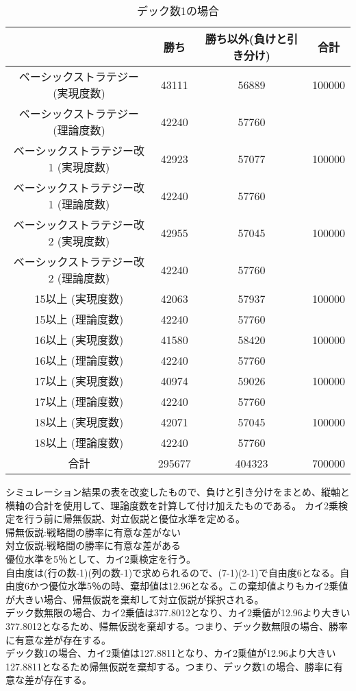 \begin{table}[H]
 \begin{center}
  \begin{tabular}{|c|c|c|c|}
    \hline
      & 勝ち & 勝ち以外(負けと引き分け) & 合計 \\
    \hline ベーシックストラテジー (実現度数)& 43111 & 56889 & 100000 \\
             ベーシックストラテジー (理論度数)& 42240 & 57760 &  \\
    \hline ベーシックストラテジー改1 (実現度数)& 42923 & 57077 & 100000 \\
             ベーシックストラテジー改1 (理論度数)& 42240 & 57760 &  \\
    \hline ベーシックストラテジー改2 (実現度数)& 42955 & 57045 & 100000 \\
              ベーシックストラテジー改2 (理論度数)& 42240 & 57760 &  \\
    \hline 15以上 (実現度数)& 42063 & 57937 & 100000 \\
             15以上 (理論度数)& 42240 & 57760 & 　\\
    \hline 16以上 (実現度数)& 41580 & 58420 & 100000 \\
             16以上 (理論度数)& 42240 & 57760 & 　\\
    \hline 17以上 (実現度数)& 40974 & 59026 & 100000 \\
             17以上 (理論度数)& 42240 & 57760 & 　\\
    \hline 18以上 (実現度数)& 42071 & 57045 & 100000 \\
             18以上 (理論度数)& 42240 & 57760 & 　\\
    \hline  合計 & 295677 & 404323 & 700000 \\
    \hline
  \end{tabular}
 \end{center}
 \caption{デック数1の場合}
\end{table}
\clearpage
シミュレーション結果の表を改変したもので、負けと引き分けをまとめ、縦軸と横軸の合計を使用して、理論度数を計算して付け加えたものである。
カイ2乗検定を行う前に帰無仮説、対立仮説と優位水準を定める。\\
帰無仮説:戦略間の勝率に有意な差がない\\
対立仮説:戦略間の勝率に有意な差がある\\
優位水準を5％として、カイ2乗検定を行う。\\
自由度は(行の数-1)(列の数-1)で求められるので、(7-1)(2-1)で自由度6となる。自由度6かつ優位水準5％の時、棄却値は12.96となる。この棄却値よりもカイ2乗値が大きい場合、帰無仮説を棄却して対立仮説が採択される。\\
デック数無限の場合、カイ2乗値は377.8012となり、カイ2乗値が12.96より大きい377.8012となるため、帰無仮説を棄却する。つまり、デック数無限の場合、勝率に有意な差が存在する。\\
デック数1の場合、カイ2乗値は127.8811となり、カイ2乗値が12.96より大きい127.8811となるため帰無仮説を棄却する。つまり、デック数1の場合、勝率に有意な差が存在する。
